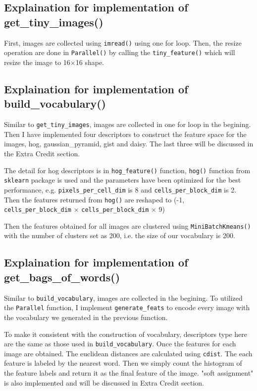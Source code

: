 \subsection*{Explaination for implementation of get\_tiny\_images()}
First, images are collected using \verb|imread()| using one for loop. Then, the resize operation are done in \verb|Parallel()| by calling the \verb|tiny_feature()| which will resize the image to 16$\times$16 shape.

\subsection*{Explaination for implementation of build\_vocabulary()}
Similar to \verb|get_tiny_images|, images are collected in one for loop in the begining. Then I have implemented four descriptors to construct the feature space for the images, hog, gaussian\_pyramid, gist and daisy. The last three will be discussed in the Extra Credit section.

The detail for hog descriptors is in \verb|hog_feature()| function, \verb|hog()| function from \verb|sklearn| package is used and the parameters have been optimized for the best performance, e.g. \verb|pixels_per_cell_dim| is 8 and \verb|cells_per_block_dim| is 2. Then the features returned from \verb|hog()| are reshaped to (-1, \verb|cells_per_block_dim| $\times$ \verb|cells_per_block_dim| $\times$ 9)

Then the features obtained for all images are clustered using \verb|MiniBatchKmeans()| with the number of clusters set as 200, i.e. the size of our vocabulary is 200.

\subsection*{Explaination for implementation of get\_bags\_of\_words()}
Similar to \verb|build_vocabulary|, images are collected in the begining. To utilized the \verb|Parallel| function, I implement \verb|generate_feats| to encode every image with the vocabulary we generated in the previous function.

To make it consistent with the construction of vocabulary, descriptors type here are the same as those used in \verb|build_vocabulary|. Once the features for each image are obtained. The euclidean distances are calculated using \verb|cdist|. The each feature is labeled by the nearest word. Then we simply count the histogram of the feature labels and return it as the final feature of the image. "soft assignment" is also implemented and will be discussed in Extra Credit section.

